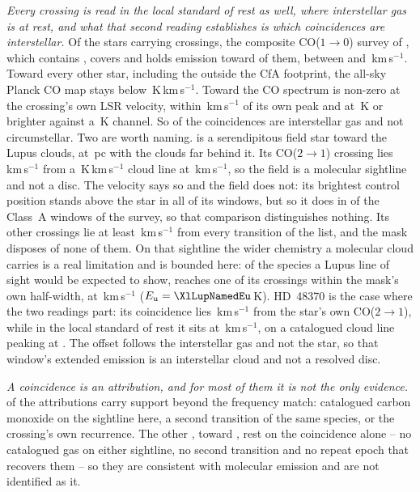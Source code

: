 \emph{Every crossing is read in the local standard of rest as well, where
interstellar gas is at rest, and what that second reading establishes is
which coincidences are interstellar.} Of the \LsNLos{} stars carrying crossings, the composite
CO($1\to0$) survey of \citet{DameThaddeus2022}, which contains
\citet{Dame2001}, covers \LsNLosCov{} and holds emission toward \LsNLosDet{}
of them, between \LsCoVLo{} and \LsCoVHi\,km\,s$^{-1}$. Toward every other
star, including the \LsNLosOut{} outside the CfA footprint, the all-sky
Planck CO map \citep{PlanckCO2016} stays below
\LsPlanckMax\,K\,km\,s$^{-1}$. Toward
\LsCloudStars{} the CO spectrum is non-zero at the crossing's own LSR
velocity, within \LsCloudDvMax\,km\,s$^{-1}$ of its own peak and at
\LsCloudTMin\,K or brighter against a \LsCoRms\,K channel. So \LsNCloud{} of
the \MkNCoinc{} coincidences are interstellar gas and not circumstellar.
Two are worth naming. \BkAlmaName{} is a serendipitous field star toward the
Lupus clouds, at \BkAlmaDistPc\,pc with the clouds far behind it. Its
CO($2\to1$) crossing lies \LsLupDv\,km\,s$^{-1}$ from a
\LsLupWco\,K\,km\,s$^{-1}$ cloud line at \LsLupVco\,km\,s$^{-1}$, so the
field is a molecular sightline and not a disc. The velocity says so and the
field
does not: its brightest control position stands above the star in all
\LsLupNRingLeadWord{} of its windows, but so it does in \LsRingLeadA{} of the
\NWinA{} Class~A windows of the survey, so that comparison
distinguishes nothing. Its other
\LsLupNFar{} crossings lie at least \LsLupFarMin\,km\,s$^{-1}$ from every
transition of the list, and the mask disposes of none of them. On that
sightline the wider chemistry a molecular cloud carries is a real limitation
and is bounded here: of the species a Lupus line of sight would be expected
to show, \XlLupNamedN{} reaches one of its crossings within the mask's own
half-width, \XlLupNamedMol{} at \XlLupNamedDv\,km\,s$^{-1}$
($E_{\rm u}=\XlLupNamedEu$\,K). HD~48370 is
the case where the two readings part: its coincidence lies
\LsHdDvStar\,km\,s$^{-1}$ from the star's own CO($2\to1$), while in the local
standard of rest it sits at \LsHdVfeat\,km\,s$^{-1}$, on a catalogued cloud
line peaking at \LsHdVco. The offset follows the interstellar gas and not the
star, so that window's extended emission is an interstellar cloud and not
a resolved disc.

\emph{A coincidence is an attribution, and for most of them it is not the
only evidence.} \LnAttrSupp{} of the \MkAttr{} attributions carry support
beyond the frequency match: catalogued carbon monoxide on the sightline here,
a second transition of the same species, or the crossing's own recurrence.
The other \LnAttrCoincWord, toward \LnCoincStars, rest on the coincidence
alone -- no catalogued gas on either sightline, no second transition and no
repeat epoch that recovers them -- so they are consistent with molecular
emission and are not identified as it.

